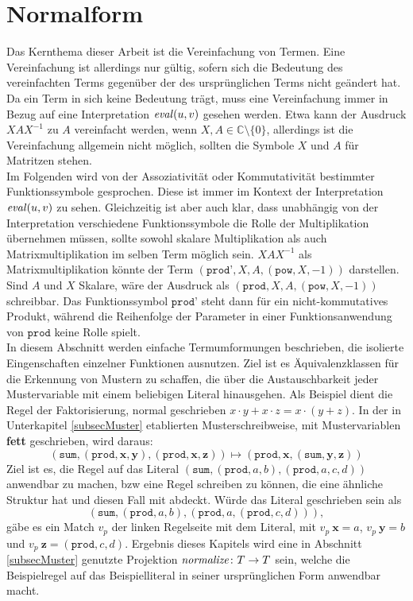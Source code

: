 



\chapter {Normalform} \label{secErsteNormalform}

Das Kernthema dieser Arbeit ist die Vereinfachung von Termen. Eine Vereinfachung ist allerdings nur gültig, sofern sich die Bedeutung des vereinfachten Terms gegenüber der des ursprünglichen Terms nicht geändert hat. Da ein Term in sich keine Bedeutung trägt, muss eine Vereinfachung immer in Bezug auf eine Interpretation $\mathit{eval}(u, v)$ gesehen werden. Etwa kann der Ausdruck $X A X^{-1}$ zu $A$ vereinfacht werden, wenn $X, A \in \mathbb{C} \setminus \{0\}$, allerdings ist die Vereinfachung allgemein nicht möglich, sollten die Symbole $X$ und $A$ für Matritzen stehen. \\
Im Folgenden wird von der Assoziativität oder Kommutativität bestimmter Funktionssymbole gesprochen. Diese ist immer im Kontext der Interpretation $\mathit{eval}(u, v)$ zu sehen. Gleichzeitig ist aber auch klar, dass unabhängig von der Interpretation verschiedene Funktionssymbole die Rolle der Multiplikation übernehmen müssen, sollte sowohl skalare Multiplikation als auch Matrixmultiplikation im selben Term möglich sein. $X A X^{-1}$ als Matrixmultiplikation könnte der Term $(\texttt{prod'}, X, A, (\texttt{pow}, X, -1))$ darstellen. Sind $A$ und $X$ Skalare, wäre der Ausdruck als $(\texttt{prod}, X, A, (\texttt{pow}, X, -1))$ schreibbar. Das Funktionssymbol $\texttt{prod'}$ steht dann für ein nicht-kommutatives Produkt, während die Reihenfolge der Parameter in einer Funktionsanwendung von $\texttt{prod}$ keine Rolle spielt.\\

In diesem Abschnitt werden einfache Termumformungen beschrieben, die isolierte Eingenschaften einzelner Funktionen ausnutzen. Ziel ist es Äquivalenzklassen für die Erkennung von Mustern zu schaffen, die über die Austauschbarkeit jeder Mustervariable mit einem beliebigen Literal hinausgehen. Als Beispiel dient die Regel der Faktorisierung, normal geschrieben $x \cdot y + x \cdot z = x \cdot (y + z)$. In der in Unterkapitel \ref{subsecMuster} etablierten Musterschreibweise, mit Mustervariablen \textbf{fett} geschrieben, wird daraus:
$$(\texttt{sum}, (\texttt{prod}, \mathbf x, \mathbf y), (\texttt{prod}, \mathbf x, \mathbf z)) \mapsto (\texttt{prod}, \mathbf x, (\texttt{sum}, \mathbf y, \mathbf z))$$
Ziel ist es, die Regel auf das Literal $(\texttt{sum}, (\texttt{prod}, a, b), (\texttt{prod}, a, c, d))$ anwendbar zu machen, bzw eine Regel schreiben zu können, die eine ähnliche Struktur hat und diesen Fall mit abdeckt. 
Würde das Literal geschrieben sein als $$(\texttt{sum}, (\texttt{prod}, a, b), (\texttt{prod}, a, (\texttt{prod}, c, d))),$$ gäbe es ein Match $v_p$ der linken Regelseite mit dem Literal, mit $v_p~\mathbf x = a$, $v_p~\mathbf y = b$ und $v_p~\mathbf z = (\texttt{prod}, c, d)$. Ergebnis dieses Kapitels wird eine in Abschnitt \ref{subsecMuster} genutzte Projektion ${\mathit{normalize} \colon T \rightarrow T}$ sein, welche die Beispielregel auf das Beispielliteral in seiner ursprünglichen Form anwendbar macht.\\

